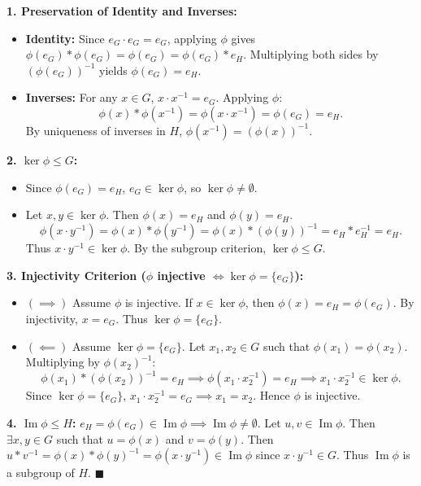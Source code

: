 \begin{solution}
\textbf{1. Preservation of Identity and Inverses:}
\begin{itemize}[leftmargin=1.5em,itemsep=2pt]
  \item \textbf{Identity:} Since $e_G \cdot e_G = e_G$, applying $\phi$ gives $\phi(e_G) * \phi(e_G) = \phi(e_G) = \phi(e_G) * e_H$. Multiplying both sides by $(\phi(e_G))^{-1}$ yields $\phi(e_G) = e_H$.
  \item \textbf{Inverses:} For any $x \in G$, $x \cdot x^{-1} = e_G$. Applying $\phi$:
  \[
  \phi(x) * \phi(x^{-1}) = \phi(x \cdot x^{-1}) = \phi(e_G) = e_H.
  \]
  By uniqueness of inverses in $H$, $\phi(x^{-1}) = (\phi(x))^{-1}$.
\end{itemize}

\textbf{2. $\ker \phi \le G$:}
\begin{itemize}[leftmargin=1.5em,itemsep=1pt]
  \item Since $\phi(e_G) = e_H$, $e_G \in \ker \phi$, so $\ker \phi \ne \emptyset$.
  \item Let $x, y \in \ker \phi$. Then $\phi(x) = e_H$ and $\phi(y) = e_H$.
  \[
  \phi(x \cdot y^{-1}) = \phi(x) * \phi(y^{-1}) = \phi(x) * (\phi(y))^{-1} = e_H * e_H^{-1} = e_H.
  \]
  Thus $x \cdot y^{-1} \in \ker \phi$. By the subgroup criterion, $\ker \phi \le G$.
\end{itemize}

\textbf{3. Injectivity Criterion ($\phi$ injective $\iff \ker \phi = \{e_G\}$):}
\begin{itemize}[leftmargin=1.5em,itemsep=2pt]
  \item $(\implies)$ Assume $\phi$ is injective. If $x \in \ker \phi$, then $\phi(x) = e_H = \phi(e_G)$. By injectivity, $x = e_G$. Thus $\ker \phi = \{e_G\}$.
  \item $(\impliedby)$ Assume $\ker \phi = \{e_G\}$. Let $x_1, x_2 \in G$ such that $\phi(x_1) = \phi(x_2)$.
  Multiplying by $\phi(x_2)^{-1}$:
  \[
  \phi(x_1) * (\phi(x_2))^{-1} = e_H \implies \phi(x_1 \cdot x_2^{-1}) = e_H \implies x_1 \cdot x_2^{-1} \in \ker \phi.
  \]
  Since $\ker \phi = \{e_G\}$, $x_1 \cdot x_2^{-1} = e_G \implies x_1 = x_2$. Hence $\phi$ is injective.
\end{itemize}

\textbf{4. $\operatorname{Im} \phi \le H$:}
$e_H = \phi(e_G) \in \operatorname{Im} \phi \implies \operatorname{Im} \phi \ne \emptyset$.
Let $u, v \in \operatorname{Im} \phi$. Then $\exists x, y \in G$ such that $u = \phi(x)$ and $v = \phi(y)$.
Then $u * v^{-1} = \phi(x) * \phi(y)^{-1} = \phi(x \cdot y^{-1}) \in \operatorname{Im} \phi$ since $x \cdot y^{-1} \in G$.
Thus $\operatorname{Im} \phi$ is a subgroup of $H$. \hfill $\blacksquare$
\end{solution}

